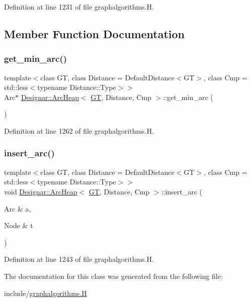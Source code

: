 Definition at line 1231 of file graphalgorithms.\+H.



\subsection{Member Function Documentation}
\mbox{\label{class_designar_1_1_arc_heap_aa97981f64e6a7868d4d8b310bfd6b1cb}} 
\subsubsection{\texorpdfstring{get\+\_\+min\+\_\+arc()}{get\_min\_arc()}}
{\footnotesize\ttfamily template$<$class GT, class Distance = Default\+Distance$<$\+G\+T$>$, class Cmp = std\+::less$<$typename Distance\+::\+Type$>$$>$ \\
Arc$\ast$ \hyperlink{class_designar_1_1_arc_heap}{Designar\+::\+Arc\+Heap}$<$ \hyperlink{demo-buildgraph_8_c_a3001c40d2c31ca87ed96cd7d1334a55e}{GT}, Distance, Cmp $>$\+::get\+\_\+min\+\_\+arc (\begin{DoxyParamCaption}{ }\end{DoxyParamCaption})\hspace{0.3cm}{\ttfamily [inline]}}



Definition at line 1262 of file graphalgorithms.\+H.

\mbox{\label{class_designar_1_1_arc_heap_a578a5310c000e671cb967799317f534d}} 
\subsubsection{\texorpdfstring{insert\+\_\+arc()}{insert\_arc()}}
{\footnotesize\ttfamily template$<$class GT, class Distance = Default\+Distance$<$\+G\+T$>$, class Cmp = std\+::less$<$typename Distance\+::\+Type$>$$>$ \\
void \hyperlink{class_designar_1_1_arc_heap}{Designar\+::\+Arc\+Heap}$<$ \hyperlink{demo-buildgraph_8_c_a3001c40d2c31ca87ed96cd7d1334a55e}{GT}, Distance, Cmp $>$\+::insert\+\_\+arc (\begin{DoxyParamCaption}\item[{Arc \&}]{a,  }\item[{Node \&}]{t }\end{DoxyParamCaption})\hspace{0.3cm}{\ttfamily [inline]}}



Definition at line 1243 of file graphalgorithms.\+H.



The documentation for this class was generated from the following file\+:\begin{DoxyCompactItemize}
\item 
include/\hyperlink{graphalgorithms_8_h}{graphalgorithms.\+H}\end{DoxyCompactItemize}
